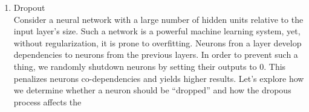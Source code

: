 \begin{enumerate}
   \item Dropout\\
     Consider a neural network with a large number of hidden units relative to the input layer's size.
     Such a network is a powerful machine learning system, yet, without regularization, it is prone to overfitting.
     Neurons fron a layer develop dependencies to neurons from the previous layers.
     In order to prevent such a thing, we randomly shutdown neurons by setting their outputs to 0.
     This penalizes neurons co-dependencies and yields higher results.
     Let's explore how we determine whether a neuron should be ``dropped'' and how the dropous process affects the 
     
     
     




\end{enumerate}     

